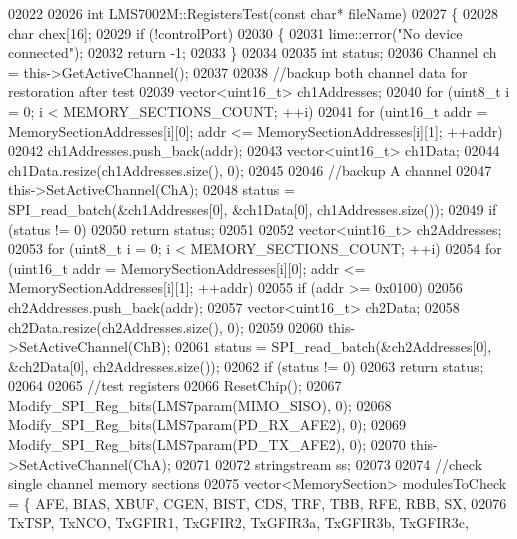\begin{DoxyCode}
{{{{{{{{{{{{{{{{{{{{{{{{{{{{{{{{{{{{{{{{{{{{{{{{{{{{{{{02022 
02026 \textcolor{keywordtype}{int} LMS7002M::RegistersTest(\textcolor{keyword}{const} \textcolor{keywordtype}{char}* fileName)
02027 \{
02028     \textcolor{keywordtype}{char} chex[16];
02029     \textcolor{keywordflow}{if} (!controlPort)
02030     \{
02031         lime::error(\textcolor{stringliteral}{"No device connected"});
02032         \textcolor{keywordflow}{return} -1;
02033     \}
02034 
02035     \textcolor{keywordtype}{int} status;
02036     Channel ch = this->GetActiveChannel();
02037 
02038     \textcolor{comment}{//backup both channel data for restoration after test}
02039     vector<uint16\_t> ch1Addresses;
02040     \textcolor{keywordflow}{for} (uint8\_t i = 0; i < MEMORY_SECTIONS_COUNT; ++i)
02041         \textcolor{keywordflow}{for} (uint16\_t addr = MemorySectionAddresses[i][0]; addr <= 
      MemorySectionAddresses[i][1]; ++addr)
02042             ch1Addresses.push\_back(addr);
02043     vector<uint16\_t> ch1Data;
02044     ch1Data.resize(ch1Addresses.size(), 0);
02045 
02046     \textcolor{comment}{//backup A channel}
02047     this->SetActiveChannel(ChA);
02048     status = SPI_read_batch(&ch1Addresses[0], &ch1Data[0], ch1Addresses.size());
02049     \textcolor{keywordflow}{if} (status != 0)
02050         \textcolor{keywordflow}{return} status;
02051 
02052     vector<uint16\_t> ch2Addresses;
02053     \textcolor{keywordflow}{for} (uint8\_t i = 0; i < MEMORY_SECTIONS_COUNT; ++i)
02054         \textcolor{keywordflow}{for} (uint16\_t addr = MemorySectionAddresses[i][0]; addr <= 
      MemorySectionAddresses[i][1]; ++addr)
02055             \textcolor{keywordflow}{if} (addr >= 0x0100)
02056                 ch2Addresses.push\_back(addr);
02057     vector<uint16\_t> ch2Data;
02058     ch2Data.resize(ch2Addresses.size(), 0);
02059 
02060     this->SetActiveChannel(ChB);
02061     status = SPI_read_batch(&ch2Addresses[0], &ch2Data[0], ch2Addresses.size());
02062     \textcolor{keywordflow}{if} (status != 0)
02063         \textcolor{keywordflow}{return} status;
02064 
02065     \textcolor{comment}{//test registers}
02066     ResetChip();
02067     Modify_SPI_Reg_bits(LMS7param(MIMO_SISO), 0);
02068     Modify_SPI_Reg_bits(LMS7param(PD_RX_AFE2), 0);
02069     Modify_SPI_Reg_bits(LMS7param(PD_TX_AFE2), 0);
02070     this->SetActiveChannel(ChA);
02071 
02072     stringstream ss;
02073 
02074     \textcolor{comment}{//check single channel memory sections}
02075     vector<MemorySection> modulesToCheck = \{ AFE, BIAS, XBUF, CGEN, BIST, CDS, 
      TRF, TBB, RFE, RBB, SX,
02076         TxTSP, TxNCO, TxGFIR1, TxGFIR2, TxGFIR3a, TxGFIR3b, TxGFIR3c,
}}}}}}}}}}}}}}}}}}}}}}}}}}}}}}}}}}}}}}}}}}}}}}}}}}}}}}}
\end{DoxyCode}
